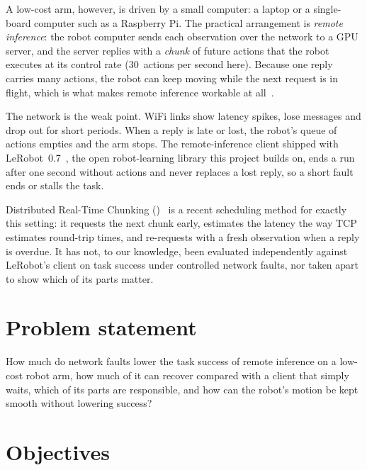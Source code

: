 A low-cost arm, however, is driven by a small computer: a laptop or a single-board computer such as a Raspberry Pi.
The practical arrangement is \emph{remote inference}: the robot computer sends each observation over the network to a
GPU server, and the server replies with a \emph{chunk} of future actions that the robot executes at its control rate
(30~actions per second here). Because one reply carries many actions, the robot can keep moving while the next request
is in flight, which is what makes remote inference workable at all~\cite{shukor2025smolvla}.

The network is the weak point. WiFi links show latency spikes, lose messages and drop out for short periods. When a
reply is late or lost, the robot's queue of actions empties and the arm stops. The remote-inference client shipped with
LeRobot~0.7~\cite{lerobot}, the open robot-learning library this project builds on, ends a run after one second without
actions and never replaces a lost reply, so a short fault ends or stalls the task.


Distributed Real-Time Chunking (\drtc)~\cite{vial2026drtc} is a recent scheduling method for exactly this setting: it
requests the next chunk early, estimates the latency the way TCP estimates round-trip times, and re-requests with a
fresh observation when a reply is overdue. It has not, to our knowledge, been evaluated independently against
LeRobot's client on task success under controlled network faults, nor taken apart to show which of its parts matter.

\section{Problem statement}

How much do network faults lower the task success of remote inference on a low-cost robot arm, how much of it can
\drtc{} recover compared with a client that simply waits, which of its parts are responsible, and how can the robot's
motion be kept smooth without lowering success?

\section{Objectives}

